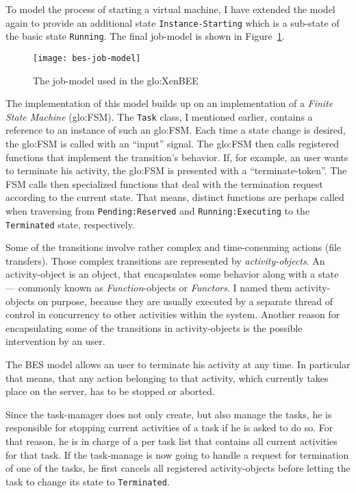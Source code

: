 To model  the process of starting  a virtual machine, I  have extended the
model  again  to provide  an  additional state  \texttt{Instance-Starting}
which  is a  sub-state  of  the basic  state  \texttt{Running}. The  final
job-model is shown in Figure~\ref{fig:bes-job-model}.

\begin{figure}[ht]
  \centering
  \texttt{[image: bes-job-model]}
  \caption{The job-model used in the \gls{glo:XenBEE}}
  \label{fig:bes-job-model}
\end{figure}

The  implementation of  this model  builds up  on an  implementation  of a
\emph{Finite State  Machine} (\gls{glo:FSM}).  The  \texttt{Task} class, I
mentioned  earlier,  contains  a  reference  to an  instance  of  such  an
\gls{glo:FSM}. Each time  a state change is desired,  the \gls{glo:FSM} is
called with  an ``input'' signal. The \gls{glo:FSM}  then calls registered
functions that  implement the transition's  behavior. If, for  example, an
user wants to terminate his  activity, the \gls{glo:FSM} is presented with
a ``terminate-token''. The FSM  calls then specialized functions that deal
with the termination  request according to the current  state. That means,
distinct   functions    are   perhaps   called    when   traversing   from
\texttt{Pending:Reserved}    and    \texttt{Running:Executing}   to    the
\texttt{Terminated} state, respectively.

Some of the transitions  involve rather complex and time-consuming actions
(\eg file  transfers).   Those  complex  transitions are  represented  by
\emph{activity-objects}.    An   activity-object   is  an   object,   that
encapsulates  some behavior  along  with  a state  ---  commonly known  as
\emph{Function}-objects or \emph{Functors}.  I named them activity-objects
on  purpose, because they  are usually  executed by  a separate  thread of
control  in concurrency  to other  activities within  the  system. Another
reason for  encapsulating some of  the transitions in  activity-objects is
the possible intervention by an user.

The BES  model allows an  user to terminate  his activity at any  time. In
particular that means,  that any action belonging to  that activity, which
currently takes place  on the server, has to be  stopped or aborted.

Since the task-manager does not only create, but also manage the tasks, he
is responsible for stopping current activities of a task if he is asked to
do so.  For that reason, he is  in charge of a per task list that contains
all current activities  for that task. If the task-manage  is now going to
handle a request for termination of one of the tasks, he first cancels all
registered activity-objects before letting the task to change its state to
\texttt{Terminated}.

